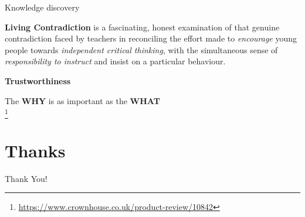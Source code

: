\documentclass[compress,ignorenonframetext,aspectratio=1610]{beamer}
\newcommand\blfootnote[1]{%
  \begingroup
  \renewcommand\thefootnote{}\footnote{\tiny{#1}}%
  \addtocounter{footnote}{-1}%
  \endgroup
}
\begin{document}
\begin{frame}{Knowledge discovery}

	\textbf{Living Contradiction} is a fascinating, honest examination of that genuine contradiction faced 
	by teachers in reconciling the effort made to \emph{encourage} young people towards \emph{independent 
	critical thinking}, with the simultaneous sense of \emph{responsibility to instruct} and insist 
	on a particular behaviour. \\

	\vspace*{1em}

	\textbf{Trustworthiness} \\

	\vspace*{1em}

	The \textbf{WHY} is as important as the \textbf{WHAT} \\

	\blfootnote{\url{https://www.crownhouse.co.uk/product-review/10842}}

\end{frame}

\section{Thanks}





			




	\begin{frame}{}
		\begin{center}
			{\fontsize{40}{50}\selectfont Thank You!}
		\end{center}
	\end{frame}
\end{document}
